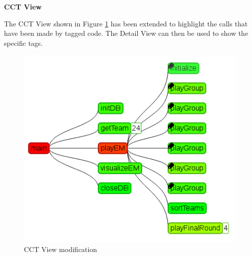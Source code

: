 \textbf{CCT View}

The CCT View shown in Figure \ref{cap3:cct} has been extended to highlight the calls that have been made by tagged code. The Detail View can then be used to show the specific tags.

\begin{figure}
	\centering
	\includegraphics[width=1\textwidth]{cct-mod}
	\caption{CCT View modification}
	\label{cap3:cct}
\end{figure}






